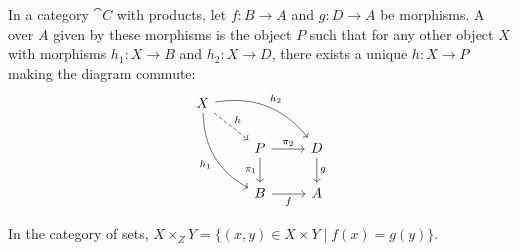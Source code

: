 \begin{node}[Pullbacks]\label{universal-prop-0001}%
\begin{definition}\label{universal-prop-0000}%
In a category $\cat{C}$ with products, let $f\colon B\to A$ and $g\colon D\to A$
be morphisms. A  over $A$ given by these morphisms is
the object $P$ such that for any other object $X$ with morphisms
$h_{1}\colon X\to B$ and $h_{2}\colon X\to D$, there exists a unique
$h\colon X\to P$ making the diagram commute:
\begin{equation*}
\begin{tikzcd}%
  X \arrow[rrd,bend left,"h_{2}"]
    \arrow[ddr,bend right,swap,"h_{1}"]
    \arrow[dr,dashed,"h"] \\
  & P \arrow[d,"\pi_{1}"'] \arrow[r,"\pi_{2}"] & D \arrow[d,"g"]  \\
  & B \arrow[r,swap,"f"]  & A
\end{tikzcd}
\end{equation*}
\end{definition}

\begin{node}[Example]
In the category of sets, $X\times_{Z}Y=\{(x,y)\in X\times Y\mid f(x)=g(y)\}$.
\end{node}
\end{node}

\begin{node}\label{universal-prop-0002}%

\end{node}
